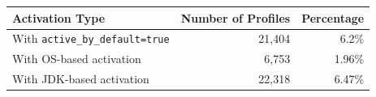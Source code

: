 \small
\begin{tabular}{@{}lrr@{}}
    \toprule
    \textbf{Activation Type} & \textbf{Number of Profiles} & \textbf{Percentage} \\
    \midrule
    
    With \texttt{active\_by\_default=true} & 21{,}404 & 6.2\% \\
    With OS-based activation & 6{,}753 & 1.96\% \\
    With JDK-based activation & 22{,}318 & 6.47\% \\

    \bottomrule
\end{tabular}
